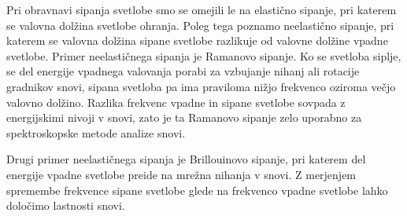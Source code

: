 \begin{remark}
Pri obravnavi sipanja svetlobe smo se omejili le na elastično sipanje, pri katerem se valovna 
dolžina svetlobe ohranja. Poleg tega poznamo neelastično sipanje, pri katerem se valovna dolžina 
sipane svetlobe razlikuje od valovne dolžine vpadne svetlobe. Primer neelastičnega sipanja
je Ramanovo sipanje. Ko se svetloba siplje, se del energije vpadnega valovanja porabi za 
vzbujanje nihanj ali rotacije gradnikov snovi, sipana svetloba pa ima praviloma nižjo frekvenco oziroma
večjo valovno dolžino. Razlika frekvenc vpadne in sipane svetlobe sovpada z energijskimi
nivoji v snovi, zato je ta Ramanovo sipanje zelo uporabno za spektroskopske metode analize snovi.

Drugi primer neelastičnega sipanja je Brillouinovo sipanje, pri katerem del energije 
vpadne svetlobe preide na mrežna nihanja v snovi. Z merjenjem spremembe frekvence sipane svetlobe
glede na frekvenco vpadne svetlobe lahko določimo lastnosti snovi.
\end{remark}
